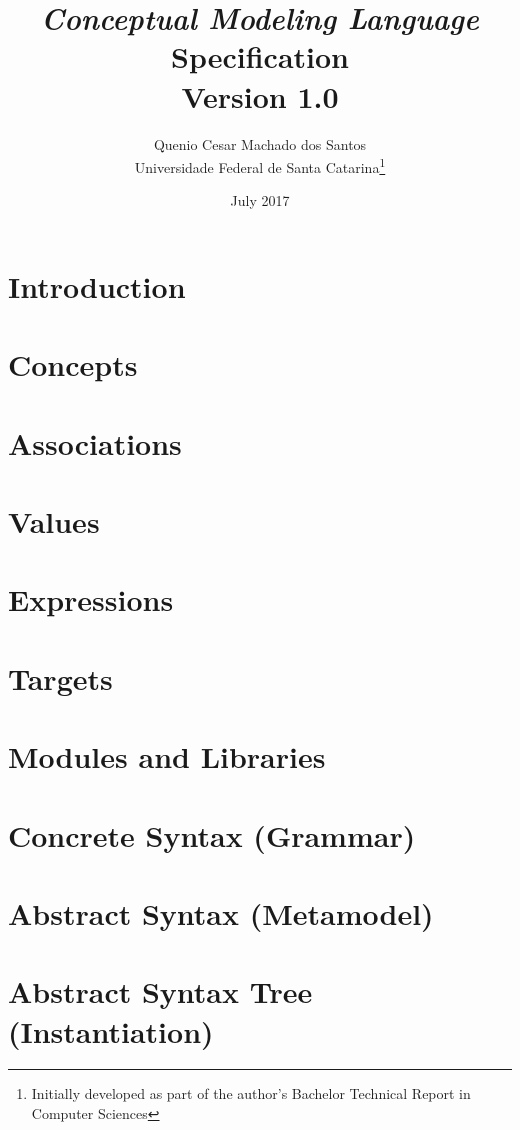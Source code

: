 \documentclass[a4paper,oneside,14pt, extrafontsizes]{memoir}
\title{\emph{Conceptual Modeling Language}\\Specification\\ \small{Version 1.0}}
\author{Quenio Cesar Machado dos Santos\\
\small{Universidade Federal de Santa Catarina}\thanks{
Initially developed as part of the author's Bachelor Technical Report in Computer Sciences}}
\date{July 2017}
\begin{document}
\begin{titlingpage}
\maketitle
\end{titlingpage}

\frontmatter

\begin{KeepFromToc}

\clearpage
\tableofcontents

\clearpage
\listoffigures

\clearpage
\listoftables 

\end{KeepFromToc}

\mainmatter

\chapter{Introduction}

\chapter{Concepts}

\chapter{Associations}

\chapter{Values}

\chapter{Expressions}

\chapter{Targets}

\chapter{Modules and Libraries}

\appendix

\chapter{Concrete Syntax (Grammar)}



\chapter{Abstract Syntax (Metamodel)}



\chapter{Abstract Syntax Tree (Instantiation)}



\backmatter
\end{document}
